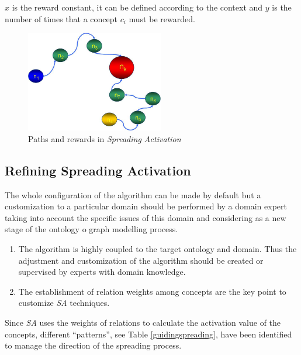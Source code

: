 \documentclass{llncs}
\begin{document}
$x$ is the reward constant, it can be defined according to the context and $y$
is the number of times that a concept $c_i$ must be rewarded.

\begin{figure}[h]
 \centering
    \includegraphics[width=6cm]{images/prize-sa}
    \caption{Paths and rewards in \textit{Spreading Activation}}
 \label{fig:prize-sa}
\end{figure}
  
  
\subsection{Refining Spreading Activation}
The whole configuration of the algorithm can be made by default but a customization
to a particular domain should be performed by a domain expert taking into account the
specific issues of this domain and considering as a new stage of the ontology o graph modelling process.

\begin{enumerate}
  \item The algorithm is highly coupled to the target ontology and domain. 
   Thus the adjustment and customization of the algorithm should be created or
  supervised by experts with domain knowledge. 
  \item The establishment of relation weights among concepts are
  the key point to customize \textit{SA} techniques. 
\end{enumerate}

Since \textit{SA} uses the weights of relations to calculate the activation
value of the concepts, different ``patterns'', see Table
\ref{guidingspreading}, have been identified to manage the direction of the spreading process.
\end{document}
